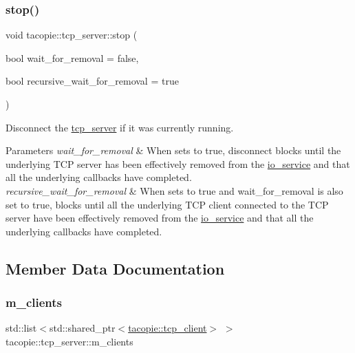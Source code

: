 \subsubsection{\texorpdfstring{stop()}{stop()}}
{\footnotesize\ttfamily void tacopie\+::tcp\+\_\+server\+::stop (\begin{DoxyParamCaption}\item[{bool}]{wait\+\_\+for\+\_\+removal = {\ttfamily false},  }\item[{bool}]{recursive\+\_\+wait\+\_\+for\+\_\+removal = {\ttfamily true} }\end{DoxyParamCaption})}

Disconnect the \hyperlink{classtacopie_1_1tcp__server}{tcp\+\_\+server} if it was currently running.


\begin{DoxyParams}{Parameters}
{\em wait\+\_\+for\+\_\+removal} & When sets to true, disconnect blocks until the underlying T\+CP server has been effectively removed from the \hyperlink{classtacopie_1_1io__service}{io\+\_\+service} and that all the underlying callbacks have completed. \\
\hline
{\em recursive\+\_\+wait\+\_\+for\+\_\+removal} & When sets to true and wait\+\_\+for\+\_\+removal is also set to true, blocks until all the underlying T\+CP client connected to the T\+CP server have been effectively removed from the \hyperlink{classtacopie_1_1io__service}{io\+\_\+service} and that all the underlying callbacks have completed. \\
\hline
\end{DoxyParams}


\subsection{Member Data Documentation}
\mbox{\label{classtacopie_1_1tcp__server_ab3e475c59504150c4f3dc68bdb932670}} 
\subsubsection{\texorpdfstring{m\+\_\+clients}{m\_clients}}
{\footnotesize\ttfamily std\+::list$<$std\+::shared\+\_\+ptr$<$\hyperlink{classtacopie_1_1tcp__client}{tacopie\+::tcp\+\_\+client}$>$ $>$ tacopie\+::tcp\+\_\+server\+::m\+\_\+clients\hspace{0.3cm}{\ttfamily [private]}}

